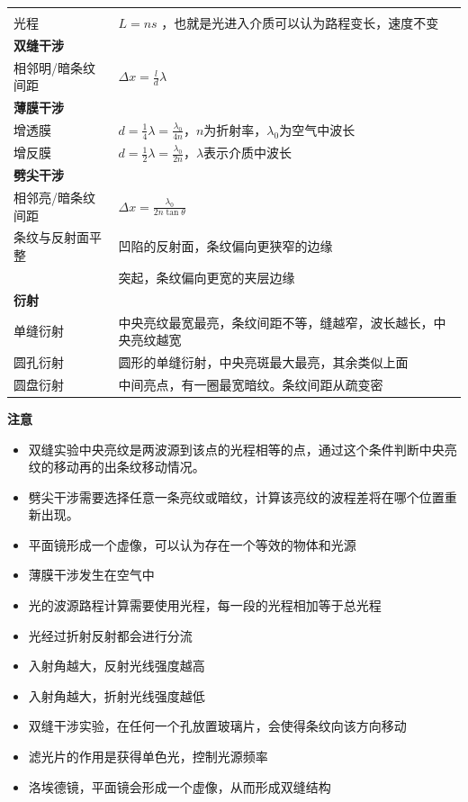 \documentclass{cheatsheet}
\begin{document}
\begin{tabularx}{\columnwidth}{XX}
	\rowcolor{blue!30}
	\multicolumn{2}{l}{\parbox[c][2.5\ht\strutbox][c]{0.9\columnwidth}{\Large 物理光学}} \\
	光程 & $L=ns$ ，也就是光进入介质可以认为路程变长，速度不变\\
	\multicolumn{2}{l}{\textbf{双缝干涉}}\\
	相邻明/暗条纹间距 & $\Delta x=\frac ld \lambda$\\
	\multicolumn{2}{l}{\textbf{薄膜干涉}}\\
	增透膜 & $d=\frac14\lambda=\frac{\lambda_0}{4n}$，$n$为折射率，$\lambda_0$为空气中波长\\
	增反膜 & $d=\frac12\lambda=\frac{\lambda_0}{2n}$，$\lambda$表示介质中波长\\
	\multicolumn{2}{l}{\textbf{劈尖干涉}}\\
	相邻亮/暗条纹间距 & $\Delta x=\frac {\lambda_0}{2n\tan\theta}$\\
	条纹与反射面平整 & 凹陷的反射面，条纹偏向更狭窄的边缘\\
	&突起，条纹偏向更宽的夹层边缘\\
	\multicolumn{2}{l}{\textbf{衍射}}\\
	单缝衍射 & 中央亮纹最宽最亮，条纹间距不等，缝越窄，波长越长，中央亮纹越宽\\
	圆孔衍射 & 圆形的单缝衍射，中央亮斑最大最亮，其余类似上面\\
	圆盘衍射 & 中间亮点，有一圈最宽暗纹。条纹间距从疏变密\\
\end{tabularx}
\textbf{注意}
\begin{itemize}
	\item 双缝实验中央亮纹是两波源到该点的光程相等的点，通过这个条件判断中央亮纹的移动再的出条纹移动情况。
	\item 劈尖干涉需要选择任意一条亮纹或暗纹，计算该亮纹的波程差将在哪个位置重新出现。
	\item 平面镜形成一个虚像，可以认为存在一个等效的物体和光源
	\item 薄膜干涉发生在空气中
	\item 光的波源路程计算需要使用光程，每一段的光程相加等于总光程
	\item 光经过折射反射都会进行分流
	\item 入射角越大，反射光线强度越高
	\item 入射角越大，折射光线强度越低
	\item 双缝干涉实验，在任何一个孔放置玻璃片，会使得条纹向该方向移动
	\item 滤光片的作用是获得单色光，控制光源频率
	\item 洛埃德镜，平面镜会形成一个虚像，从而形成双缝结构
\end{itemize}
\end{document}
